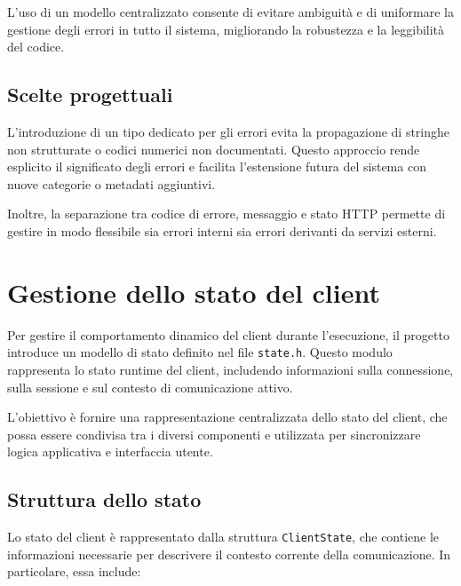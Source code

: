 \documentclass[a4paper, 11pt, twoside]{report}
\begin{document}
L'uso di un modello centralizzato consente di evitare ambiguità e di uniformare la gestione degli errori in tutto il sistema,
migliorando la robustezza e la leggibilità del codice.

\subsection{Scelte progettuali}

L'introduzione di un tipo dedicato per gli errori evita la propagazione di stringhe non strutturate o codici numerici non 
documentati. Questo approccio rende esplicito il significato degli errori e facilita l'estensione futura del sistema con nuove categorie o metadati aggiuntivi.

Inoltre, la separazione tra codice di errore, messaggio e stato \gls{HTTP} permette di gestire in modo flessibile sia errori 
interni sia errori derivanti da servizi esterni.

\section{Gestione dello stato del client}

Per gestire il comportamento dinamico del client durante l'esecuzione, il progetto introduce un modello di stato definito nel 
file \texttt{state.h}. Questo modulo rappresenta lo stato runtime del client, includendo informazioni sulla connessione, sulla 
sessione e sul contesto di comunicazione attivo.

L'obiettivo è fornire una rappresentazione centralizzata dello stato del client, che possa essere condivisa tra i diversi componenti
e utilizzata per sincronizzare logica applicativa e interfaccia utente.

\subsection{Struttura dello stato}

Lo stato del client è rappresentato dalla struttura \texttt{ClientState}, che contiene le informazioni necessarie per descrivere il
contesto corrente della comunicazione. 
In particolare, essa include:
\end{document}
